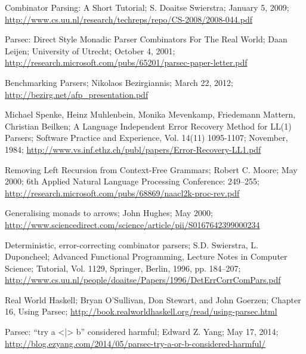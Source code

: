 \begin{thebibliography}{99}
\begin{multicols}{2}
  Combinator Parsing: A Short Tutorial;
  S. Doaitse Swierstra;
  January 5, 2009;
  \url{http://www.cs.uu.nl/research/techreps/repo/CS-2008/2008-044.pdf}

	Parsec: Direct Style Monadic Parser Combinators For The Real World;
	Daan Leijen;
	University of Utrecht;
	October 4, 2001;
	\url{http://research.microsoft.com/pubs/65201/parsec-paper-letter.pdf}
  
	Benchmarking Parsers;
	Nikolaos Bezirgiannis;
	March 22, 2012;
	\url{http://bezirg.net/afp_presentation.pdf}

	Michael Spenke, Heinz Muhlenbein, Monika Mevenkamp, Friedemann Mattern, Christian Beilken;
	A Language Independent Error Recovery Method for LL(1) Parsers;
	Software Practice and Experience, Vol. 14(11) 1095-1107;
	November, 1984;
	\url{http://www.vs.inf.ethz.ch/publ/papers/Error-Recovery-LL1.pdf}

	Removing Left Recursion from Context-Free Grammars;
	Robert C. Moore;
	May 2000;
	6th Applied Natural Language Processing Conference: 249–255;
	\url{http://research.microsoft.com/pubs/68869/naacl2k-proc-rev.pdf}

	Generalising monads to arrows;
	John Hughes;
	May 2000;
	\url{http://www.sciencedirect.com/science/article/pii/S0167642399000234}

	Deterministic, error-correcting combinator parsers;
	S.D. Swierstra, L. Duponcheel;
	Advanced Functional Programming, Lecture Notes in Computer Science;
	Tutorial, Vol. 1129, Springer, Berlin, 1996, pp. 184--207;
	\url{http://www.cs.uu.nl/people/doaitse/Papers/1996/DetErrCorrComPars.pdf}

	Real World Haskell;
	Bryan O'Sullivan, Don Stewart, and John Goerzen;
	Chapter 16, Using Parsec;
	\url{http://book.realworldhaskell.org/read/using-parsec.html}

	Parsec: ``try a <|> b'' considered harmful;
	Edward Z. Yang;
	May 17, 2014;
	\url{http://blog.ezyang.com/2014/05/parsec-try-a-or-b-considered-harmful/}


\end{multicols}

\end{thebibliography}